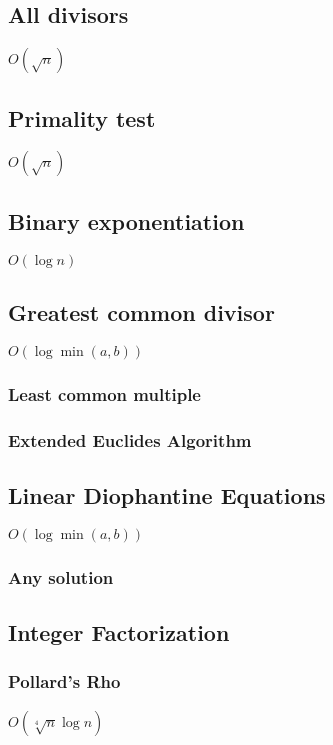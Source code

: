 \documentclass{article}
\begin{document}
\subsection{All divisors}
$O(\sqrt{n})$


\subsection{Primality test}
$O(\sqrt{n})$


\subsection{Binary exponentiation}
$O(\log n)$


\subsection{Greatest common divisor}
$O(\log \min (a, b))$

\subsubsection{Least common multiple}

\subsubsection{Extended Euclides Algorithm}


\subsection{Linear Diophantine Equations}
$O(\log \min (a, b))$
\subsubsection{Any solution}


\subsection{Integer Factorization}
\subsubsection{Pollard's Rho}
$O(\sqrt[4]{n}\log n)$

\end{document}
